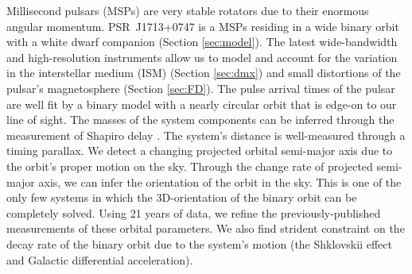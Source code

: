 Millisecond pulsars (MSPs) are very stable rotators due to their enormous
angular momentum. PSR~J1713+0747 is a MSPs residing in a wide binary orbit with a white dwarf companion (Section \ref{sec:model}). 
The latest wide-bandwidth and high-resolution instruments allow us to model and account for the variation in the interstellar medium (ISM)
(Section \ref{sec:dmx}) and small distortions of the pulsar's magnetosphere (Section \ref{sec:FD}). 
The pulse arrival times of the pulsar are well fit by a binary model with
a nearly circular orbit that is edge-on to our line of sight. The masses of
the system components can be inferred through the measurement of Shapiro delay \citep{sns+05}. 
The system's distance is well-measured through a timing parallax. We detect
a changing projected orbital semi-major axis due to the orbit's proper motion
on the sky. Through the change rate of projected semi-major axis, we can infer 
the orientation of the orbit in the sky.
This is one of the only few systems in which the 3D-orientation of the
binary orbit can be completely solved. Using 21 years of data, we
refine the previously-published measurements of these orbital parameters.
We also find strident constraint on the decay rate of the binary orbit due to the system's
motion (the Shklovskii effect and Galactic differential acceleration).

